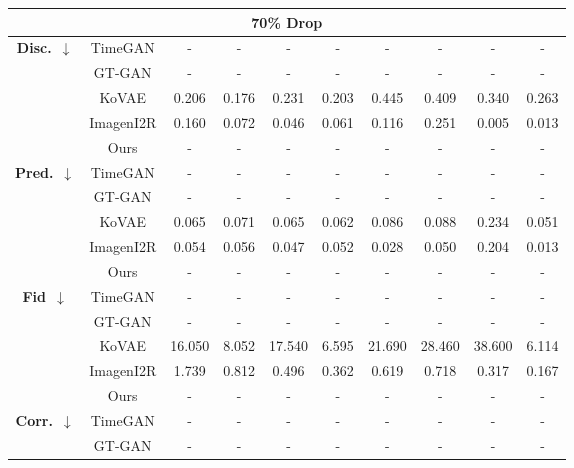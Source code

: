 \documentclass{article}
\theoremstyle{plain}
\theoremstyle{definition}
\theoremstyle{remark}
\begin{document}
\begin{table}[!t]
{\begin{tabular}{cc|cccccccc}
    \multicolumn{10}{c}{\textbf{70\% Drop}} \\
    \midrule
    \multirow{5}{*}{\textbf{Disc.}~$\downarrow$}
      & TimeGAN & - & - & - & - & - & - & - & - \\
      & GT-GAN  & - & - & - & - & - & - & - & - \\
      & KoVAE 
          & 0.206 
          & 0.176 
          & 0.231 
          & 0.203 
          & 0.445 
          & 0.409 
          & 0.340 
          & 0.263 \\
      & ImagenI2R  
          & 0.160
          & 0.072
          & 0.046
          & 0.061
          & 0.116
          & 0.251
          & 0.005
          & 0.013 \\
    & Ours
       & - & - & - & - & - & - & - & - \\
    \midrule
    \multirow{5}{*}{\textbf{Pred.}~$\downarrow$}
      & TimeGAN & - & - & - & - & - & - & - & - \\
      & GT-GAN  & - & - & - & - & - & - & - & - \\
      & KoVAE 
          & 0.065 
          & 0.071 
          & 0.065 
          & 0.062 
          & 0.086 
          & 0.088 
          & 0.234 
          & 0.051 \\
      & ImagenI2R  
          & 0.054
          & 0.056
          & 0.047
          & 0.052
          & 0.028
          & 0.050
          & 0.204
          & 0.013 \\
    & Ours
       & - & - & - & - & - & - & - & - \\
    \midrule
    \multirow{5}{*}{\textbf{Fid}~$\downarrow$}
      & TimeGAN & - & - & - & - & - & - & - & - \\
      & GT-GAN  & - & - & - & - & - & - & - & - \\
      & KoVAE 
          & 16.050 
          & 8.052 
          & 17.540 
          & 6.595 
          & 21.690 
          & 28.460 
          & 38.600 
          & 6.114 \\
      & ImagenI2R  
          & 1.739
          & 0.812
          & 0.496
          & 0.362
          & 0.619
          & 0.718
          & 0.317
          & 0.167 \\
    & Ours
       & - & - & - & - & - & - & - & - \\
    \midrule
    \multirow{5}{*}{\textbf{Corr.}~$\downarrow$}
      & TimeGAN & - & - & - & - & - & - & - & - \\
      & GT-GAN  & - & - & - & - & - & - & - & - \\

\end{tabular}}
\end{table}
\end{document}
